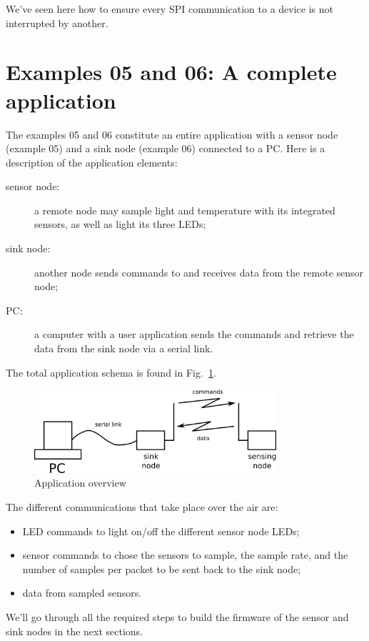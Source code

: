 \documentclass[11pt]{report}
\begin{document}
We've seen here how to ensure every SPI communication to a device is not interrupted by another.


\section{Examples 05 and 06: A complete application}
The examples 05 and 06 constitute an entire application with a sensor node (example 05) and a sink node (example 06) connected to a PC. Here is a description of the application elements:
\begin{description}
	\item[sensor node:] a remote node may sample light and temperature with its integrated sensors, as well as light its three LEDs;
	\item [sink node:] another node sends commands to and receives data from the remote sensor node;
	\item [PC:] a computer with a user application sends the commands and retrieve the data from the sink node via a serial link.
\end{description}
The total application schema is found in Fig.~\ref{fig:archi}.

\begin{figure}[ht]
	\begin{center}
	\includegraphics[width=0.8\textwidth]{figures/archi.png}
	\end{center}
	\caption{Application overview}
	\label{fig:archi}
\end{figure}

The different communications that take place over the air are:
\begin{itemize}
	\item LED commands to light on/off the different sensor node LEDs;
	\item sensor commands to chose the sensors to sample, the sample rate, and the number of samples per packet to be sent back to the sink node;
	\item data from sampled sensors.
\end{itemize}

We'll go through all the required steps to build the firmware of the sensor and sink nodes in the next sections.
\end{document}

